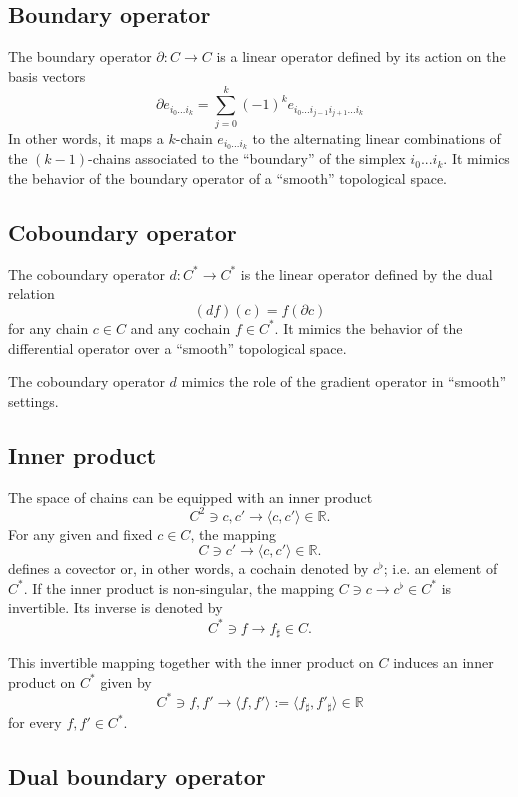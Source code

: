 \documentclass[aps,prl,twocolumn,groupedaddress]{revtex4-2}
\newcommand{\RR}{\mathbb{R}}
\begin{document}
\subsection{Boundary operator}

The boundary operator $\partial:C\to C$ is a linear operator defined by its action on the basis vectors
$$
\partial
e_{i_0...i_k}
=
\sum_{j=0}^k
(-1)^k
e_{i_0...i_{j-1}i_{j+1}...i_k}
$$
In other words, it maps a $k$-chain $e_{i_0...i_k}$ to the alternating linear combinations of the $(k-1)$-chains associated to the  ``boundary'' of the simplex $i_0...i_k$.
It mimics the behavior of the boundary operator of a ``smooth'' topological space.

\subsection{Coboundary operator}

The coboundary operator $d:C^*\to C^*$ is the linear operator defined by the dual relation
$$
(df)(c)
=
f(\partial c)
$$
for any chain $c\in C$ and any cochain $f\in C^*$.
It mimics the behavior of the differential operator over a ``smooth'' topological space.

The coboundary operator $d$ mimics the role of the gradient operator in ``smooth'' settings.

\subsection{Inner product}

The space of chains can be equipped with an inner product
$$
C^2 \ni c,c' \to \langle c , c'\rangle \in \RR.
$$
For any given and fixed $c\in C$, the mapping
$$
C\ni c' \to \langle c , c'\rangle \in \RR.
$$
defines a covector or, in other words, a cochain denoted by $c^{\flat}$; i.e. an element of $C^*$.
If the inner product is non-singular, the mapping $C\ni c \to c^{\flat} \in C^*$ is invertible.
Its inverse is denoted by
$$
C^* \ni f \to f_{\sharp} \in C.
$$

This invertible mapping together with the inner product on $C$ induces an inner product on $C^*$ given by
$$
C^*\ni f,f' \to \langle f,f' \rangle := \langle f_{\sharp}, f'_{\sharp} \rangle \in \RR
$$
for every $f,f'\in C^*$.

\subsection{Dual boundary operator}
\end{document}
